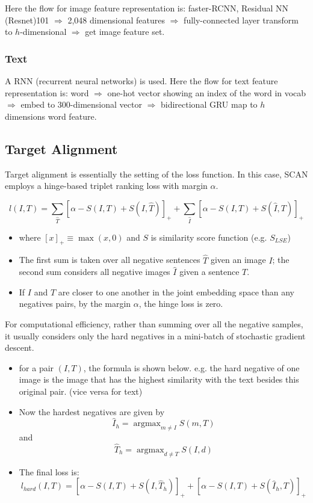 Here the flow for image feature representation is: faster-RCNN, Residual NN (Resnet)101 $\Rightarrow$ 2,048 dimensional features $\Rightarrow$ fully-connected layer transform to $h$-dimensional $\Rightarrow$ get image feature set.

\subsubsection{Text}A RNN (recurrent neural networks) is used. Here the flow for text feature representation is: word $\Rightarrow$ one-hot vector showing an index of the word in vocab $\Rightarrow$ embed to 300-dimensional vector $\Rightarrow$ bidirectional GRU map to $h$ dimensions word feature.

\subsection{Target Alignment}
Target alignment is essentially the setting of the loss function. In this case, SCAN employs a hinge-based triplet ranking loss with margin $\alpha$.

$$
l(I, T)=\sum_{\hat{T}}[\alpha-S(I, T)+S(I, \hat{T})]_{+}+\sum_{\hat{I}}[\alpha-S(I, T)+S(\hat{I}, T)]_{+}
$$

\begin{itemize}
    \item where $[x]_{+} \equiv \max (x, 0)$ and $S$ is similarity score function (e.g. $S_{L S E}$)
    \item The first sum is taken over all negative sentences $\hat{T}$ given an image $I$; the second sum considers all negative images $\hat{I}$ given a sentence $T$.
    \item If $I$ and $T$ are closer to one another in the joint embedding space than any negatives pairs, by the margin $\alpha$, the hinge loss is zero.
\end{itemize}

For computational efficiency, rather than summing over all the negative samples, it usually considers only the hard negatives in a mini-batch of stochastic gradient descent.

\begin{itemize}
    \item for a pair $(I, T)$, the formula is shown below. e.g. the hard negative of one image is the image that has the highest similarity with the text besides this original pair. (vice versa for text)
    \item Now the hardest negatives are given by $$\hat{I}_{h}=\operatorname{argmax}_{m \neq I} S(m, T)$$ and $$\hat{T}_{h}=\operatorname{argmax}_{d \neq T} S(I, d)$$
    \item The final loss is: 
    $$l_{h a r d}(I, T)=\left[\alpha-S(I, T)+S\left(I, \hat{T}_{h}\right)\right]_{+}+\left[\alpha-S(I, T)+S\left(\hat{I}_{h}, T\right)\right]_{+}$$
\end{itemize}

